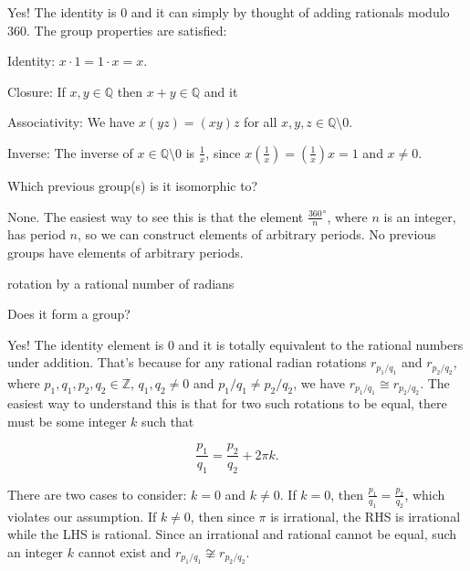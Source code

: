 \documentclass[../gatm_answers.tex]{subfiles}
\begin{document}
Yes! The identity is $0$ and it can simply by thought of adding rationals modulo $360$. The group properties are satisfied:

Identity: $x\cdot 1=1\cdot x=x$.

Closure: If $x,y\in\mathbb{Q}$ then $x+y\in \mathbb{Q}$ and it 

Associativity: We have $x(yz)=(xy)z$ for all $x,y,z \in \mathbb{Q} \setminus {0}$.

Inverse: The inverse of $x\in \mathbb{Q} \setminus {0}$ is $\frac{1}{x}$, since $x\left(\frac{1}{x}\right)=\left(\frac{1}{x}\right)x=1$ and $x\neq 0$.

\begin{iinner_problem}
\item Which previous group(s) is it isomorphic to?
\end{iinner_problem}

None. The easiest way to see this is that the element $\frac{360}{n}^\circ$, where $n$ is an integer, has period $n$, so we can construct elements of arbitrary periods. No previous groups have elements of arbitrary periods.

\begin{inner_problem}
\item rotation by a rational number of radians
\end{inner_problem}

\begin{iinner_problem}[start=1]
\item Does it form a group?
\end{iinner_problem}

Yes! The identity element is $0$ and it is totally equivalent to the rational numbers under addition. That's because for any rational radian rotations $r_{p_1/q_1}$ and $r_{p_2/q_2}$, where $p_1,q_1,p_2,q_2\in \mathbb{Z}$, $q_1,q_2\neq 0$ and $p_1/q_1\neq p_2/q_2$, we have $r_{p_1/q_1}\cong r_{p_2/q_2}$. The easiest way to understand this is that for two such rotations to be equal, there must be some integer $k$ such that

$$\frac{p_1}{q_1} = \frac{p_2}{q_2} + 2\pi k.$$

There are two cases to consider: $k=0$ and $k\neq 0$. If $k=0$, then $\frac{p_1}{q_1} = \frac{p_2}{q_2}$, which violates our assumption. If $k\neq 0$, then since $\pi$ is irrational, the RHS is irrational while the LHS is rational. Since an irrational and rational cannot be equal, such an integer $k$ cannot exist and $r_{p_1/q_1}\not\cong r_{p_2/q_2}$.
\end{document}
